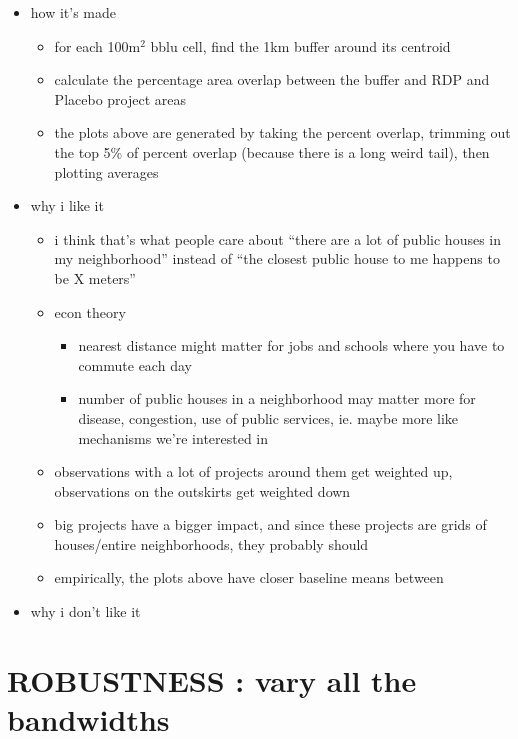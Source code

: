\documentclass[12pt]{article}
\begin{document}
\begin{itemize}
	\item how it's made
	\begin{itemize} 
		\item for each 100$\text{m}^{2}$ bblu cell, find the 1km buffer around its centroid
		\item calculate the percentage area overlap between the buffer and RDP and Placebo project areas
		\item the plots above are generated by taking the percent overlap, trimming out the top 5\% of percent overlap (because there is a long weird tail), then plotting averages
	\end{itemize}
	\item why i like it
	\begin{itemize}
		\item i think that's what people care about ``there are a lot of public houses in my neighborhood'' instead of ``the closest public house to me happens to be X meters''
		\item econ theory
		\begin{itemize}
			\item nearest distance might matter for jobs and schools where you have to commute each day
			\item number of public houses in a neighborhood may matter more for disease, congestion, use of public services, ie. maybe more like mechanisms we're interested in 
		\end{itemize}
		\item observations with a lot of projects around them get weighted up, observations on the outskirts get weighted down
		\item big projects have a bigger impact, and since these projects are grids of houses/entire neighborhoods, they probably should
        \item empirically, the plots above have closer baseline means between 
	\end{itemize}
    \item why i don't like it
\end{itemize}




\pagebreak


\section{ROBUSTNESS : vary all the bandwidths}
\end{document}
